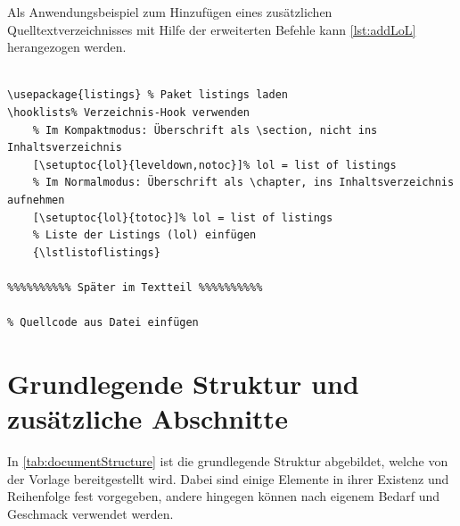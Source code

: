 	Als Anwendungsbeispiel zum Hinzufügen eines zusätzlichen Quelltextverzeichnisses mit Hilfe der erweiterten Befehle kann \cref{lst:addLoL} herangezogen werden.
	
	\begin{lstlisting}[style=MyLatexStyle,caption={Beispielcode zum Hinzufügen eines Quelltextverzeichnisses mit dem Paket \textit{listings}.},label=lst:addLoL]
%%%%%%%%%% In der Präambel %%%%%%%%%%

\usepackage{listings} % Paket listings laden
\hooklists% Verzeichnis-Hook verwenden
	% Im Kompaktmodus: Überschrift als \section, nicht ins Inhaltsverzeichnis
	[\setuptoc{lol}{leveldown,notoc}]% lol = list of listings
	% Im Normalmodus: Überschrift als \chapter, ins Inhaltsverzeichnis aufnehmen
	[\setuptoc{lol}{totoc}]% lol = list of listings
	% Liste der Listings (lol) einfügen
	{\lstlistoflistings}

%%%%%%%%%% Später im Textteil %%%%%%%%%%

% Quellcode aus Datei einfügen

	\end{lstlisting}
	
	
	
	\chapter{Grundlegende Struktur und zusätzliche Abschnitte}
	\label{cha:additionalChapters}
	
	In \cref{tab:documentStructure} ist die grundlegende Struktur abgebildet, welche von der Vorlage bereitgestellt wird.
	Dabei sind einige Elemente in ihrer Existenz und Reihenfolge fest vorgegeben, andere hingegen können nach eigenem Bedarf und Geschmack verwendet werden.
	
